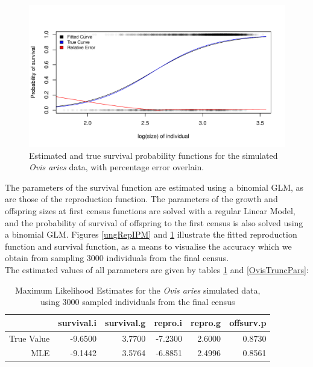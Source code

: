 \documentclass[a4paper,12pt]{article}
\begin{document}
\begin{figure}[H]
\centering
\includegraphics[scale=0.85]{UngulateSurvIPM.pdf}
\caption{\label{ungSurIPM}Estimated and true survival probability functions for the simulated \textit{Ovis aries} data, with percentage error overlain.}
\end{figure}

The parameters of the survival function are estimated using a binomial GLM, as are those of the reproduction function. The parameters of the growth and offspring sizes at first census functions are solved with a regular Linear Model, and the probability of survival of offspring to the first census is also solved using a binomial GLM. Figures \ref{ungRepIPM} and \ref{ungSurIPM} illustrate the fitted reproduction function and survival function, as a means to visualise the accuracy which we obtain from sampling 3000 individuals from the final census.\\

The estimated values of all parameters are given by tables \ref{OvisPars} and \ref{OvisTruncPars}:\\

\begin{table}[ht]
\centering
\begin{tabular}{rrrrrr}
  \hline
 & \textbf{survival.i} & \textbf{survival.g} & \textbf{repro.i} & \textbf{repro.g} & \textbf{offsurv.p} \\ 
  \hline
 True Value & -9.6500 & 3.7700 & -7.2300 & 2.6000 & 0.8730 \\ 
  MLE & -9.1442 & 3.5764 & -6.8851 & 2.4996 & 0.8561 \\ 
   \hline
\end{tabular}
\caption{\label{OvisPars}Maximum Likelihood Estimates for the \textit{Ovis aries} simulated data, using 3000 sampled individuals from the final census}
\end{table}
\end{document}

